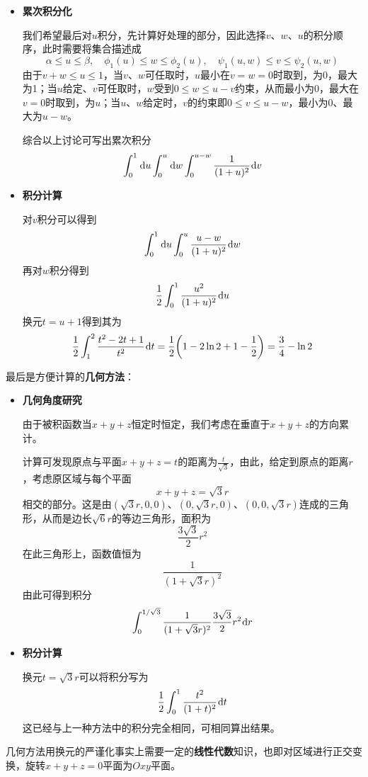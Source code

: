\documentclass[a4paper,UTF8,fontset=windows,AutoFakeBold]{ctexart}
\newcommand*{\dr}{\hspace{0.07em}\mathrm{d}}
\newcommand*{\note}{\noindent *}
\theoremstyle{ex}
\begin{document}
\begin{framed}
{\begin{itemize}
        由于被积函数为$x+y+z$的函数，希望换元使得$x+y+z$看作整体。

        考虑$u=x+y+z$、$v=y$、$w=z$，直接计算Jacobi行列式可知
        $$\dr x\dr y\dr z=\dr u\dr v\dr w$$
        且被积函数成为$\frac{1}{(1+u)^2}$，约束化为
        $$u-v-w\ge0,\quad v\ge0,\quad w\ge0,\quad u\le1$$
        将上方约束确定的$(u,v,w)$区域记为$\Omega_0$，积分即化为
        $$\iiint_{\Omega_0}\frac{1}{(1+u)^2}\dr u\dr v\dr w$$
        
        \item \textbf{累次积分化}
        
        我们希望最后对$u$积分，先计算好处理的部分，因此选择$v$、$w$、$u$的积分顺序，此时需要将集合描述成
        $$\alpha\le u\le\beta,\quad\phi_1(u)\le w\le\phi_2(u),\quad\psi_1(u,w)\le v\le\psi_2(u,w)$$
        由于$v+w\le u\le1$，当$v$、$w$可任取时，$u$最小在$v=w=0$时取到，为0，最大为1；当$u$给定、$v$可任取时，$w$受到$0\le w\le u-v$约束，从而最小为0，最大在$v=0$时取到，为$u$；当$u$、$w$给定时，$v$的约束即$0\le v\le u-w$，最小为0、最大为$u-w$。
        
        综合以上讨论可写出累次积分
        $$\int_0^1\dr u\int_0^u\dr w\int_0^{u-w}\frac{1}{(1+u)^2}\dr v$$

        \item \textbf{积分计算}
        
        对$v$积分可以得到
        $$\int_0^1\dr u\int_0^u\frac{u-w}{(1+u)^2}\dr w$$
        再对$w$积分得到
        $$\frac{1}{2}\int_0^1\frac{u^2}{(1+u)^2}\dr u$$
        换元$t=u+1$得到其为
        $$\frac{1}{2}\int_1^2\frac{t^2-2t+1}{t^2}\dr t=\frac{1}{2}\bigg(1-2\ln2+1-\frac{1}{2}\bigg)=\frac{3}{4}-\ln2$$  
    \end{itemize}

    最后是方便计算的\textbf{几何方法}：
    \begin{itemize}
        \item \textbf{几何角度研究}
        
        由于被积函数当$x+y+z$恒定时恒定，我们考虑在垂直于$x+y+z$的方向累计。

        计算可发现原点与平面$x+y+z=t$的距离为$\frac{t}{\sqrt3}$，由此，给定到原点的距离$r$，考虑原区域与每个平面
        $$x+y+z=\sqrt3r$$
        相交的部分。这是由$(\sqrt3r,0,0)$、$(0,\sqrt3r,0)$、$(0,0,\sqrt3r)$连成的三角形，从而是边长$\sqrt6r$的等边三角形，面积为
        $$\frac{3\sqrt3}{2}r^2$$
        在此三角形上，函数值恒为
        $$\frac{1}{(1+\sqrt3r)^2}$$
        由此可得到积分
        $$\int_0^{1/\sqrt3}\frac{1}{(1+\sqrt3r)^2}\frac{3\sqrt3}{2}r^2\dr r$$
        
        \item \textbf{积分计算}
        
        换元$t=\sqrt3r$可以将积分写为
        $$\frac{1}{2}\int_0^1\frac{t^2}{(1+t)^2}\dr t$$
        这已经与上一种方法中的积分完全相同，可相同算出结果。
    \end{itemize}

    \note 几何方法用换元的严谨化事实上需要一定的\textbf{线性代数}知识，也即对区域进行正交变换，旋转$x+y+z=0$平面为$Oxy$平面。
}
\end{framed}
\end{document}
